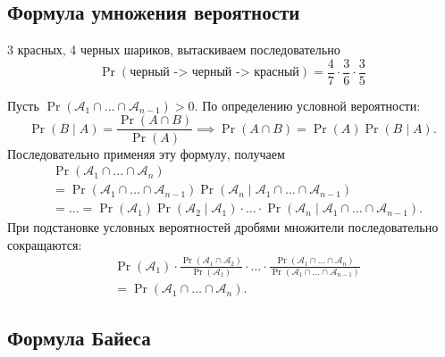 \subsection{Формула умножения вероятности}
\begin{definition}
    3 красных, 4 черных шариков, вытаскиваем последовательно
    \[
        \Pr(\text{черный -> черный -> красный}) = \frac{4}{7} \cdot \frac{3}{6} \cdot \frac{3}{5}
    \]

\end{definition}

\begin{Proof}
    Пусть $\Pr(\mathcal{A}_1 \cap \dots \cap \mathcal{A}_{n-1}) > 0$.
    По определению условной вероятности:
    \[
        \Pr(B \mid A)
        =
        \frac{\Pr(A \cap B)}{\Pr(A)}
        \implies
        \Pr(A \cap B) = \Pr(A)\Pr(B \mid A).
    \]
    Последовательно применяя эту формулу, получаем
    \[
        \begin{aligned}
            &\Pr(\mathcal{A}_1 \cap \dots \cap \mathcal{A}_n)
            \\
            &=
            \Pr(\mathcal{A}_1 \cap \dots \cap \mathcal{A}_{n-1})
            \Pr(\mathcal{A}_n \mid
                \mathcal{A}_1 \cap \dots \cap \mathcal{A}_{n-1})
            \\
            &= \dots =
            \Pr(\mathcal{A}_1)
            \Pr(\mathcal{A}_2 \mid \mathcal{A}_1)
            \cdot \ldots \cdot
            \Pr(\mathcal{A}_n \mid
                \mathcal{A}_1 \cap \dots \cap \mathcal{A}_{n-1}).
        \end{aligned}
    \]
    При подстановке условных вероятностей дробями
    множители последовательно сокращаются:
    \[
        \begin{aligned}
            &\Pr(\mathcal{A}_1)
            \cdot
            \frac{\Pr(\mathcal{A}_1 \cap \mathcal{A}_2)}
                 {\Pr(\mathcal{A}_1)}
            \cdot \ldots \cdot
            \frac{\Pr(\mathcal{A}_1 \cap \dots \cap \mathcal{A}_n)}
                 {\Pr(\mathcal{A}_1 \cap \dots \cap \mathcal{A}_{n-1})}
            \\
            &= \Pr(\mathcal{A}_1 \cap \dots \cap \mathcal{A}_n).
        \end{aligned}
    \]
\end{Proof}
\subsection{Формула Байеса}

